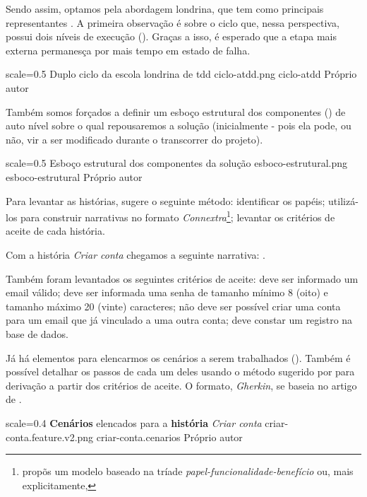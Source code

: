   Sendo assim, optamos pela abordagem londrina, que tem como principais representantes . A primeira observação é sobre o ciclo que, nessa perspectiva, possui dois níveis de execução (). Graças a isso, é esperado que a etapa mais externa permanesça por mais tempo em estado de falha.

  \imagem
    {scale=0.5}
    {Duplo ciclo da escola londrina de tdd}
    {ciclo-atdd.png}
    {ciclo-atdd}
    {Próprio autor\footnotemark}

  Também somos forçados a definir um esboço estrutural dos componentes () de auto nível sobre o qual repousaremos a solução (inicialmente - pois ela pode, ou não, vir a ser modificado durante o transcorrer do projeto).

  \imagem
    {scale=0.5}
    {Esboço estrutural dos componentes da solução}
    {esboco-estrutural.png}
    {esboco-estrutural}
    {Próprio autor}

  Para levantar as histórias,  sugere o seguinte método: identificar os papéis; utilizá-los para construir narrativas no formato \emph{Connextra}\footnote{ propõs um modelo baseado na tríade \emph{papel-funcionalidade-benefício} ou, mais explicitamente, }; levantar os critérios de aceite de cada história.

  Com a história \emph{Criar conta} chegamos a seguinte narrativa: .

  Também foram levantados os seguintes critérios de aceite: deve ser informado um email válido; deve ser informada uma senha de tamanho mínimo 8 (oito) e tamanho máximo 20 (vinte) caracteres; não deve ser possível criar uma conta para um email que já vinculado a uma outra conta; deve constar um registro na base de dados.

  Já há elementos para elencarmos os cenários a serem trabalhados (). Também é possível detalhar os passos de cada um deles usando o método sugerido por  para derivação a partir dos critérios de aceite. O formato, \emph{Gherkin}, se baseia no artigo de .

  \imagem
    {scale=0.4}
    {\textbf{Cenários} elencados para a \textbf{história} \emph{Criar conta}}
    {criar-conta.feature.v2.png}
    {criar-conta.cenarios}
    {Próprio autor\footnotemark}

